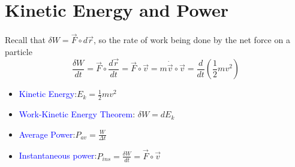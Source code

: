 \documentclass{beamer}
\begin{document}
\section{Kinetic Energy and Power}
\begin{frame}
  Recall that $\delta W = \vec{F}\circ d\vec{r}$, so the rate of work being done by the net force on a particle 
  $$
  \frac{\delta W}{dt} = \vec{F}\circ \frac{d\vec{r}}{dt}=\vec{F}\circ \vec{v} = m \dot{\vec{v}}\circ \vec{v}=\frac{d}{dt}(\frac{1}{2}mv^2) 
  $$
  \begin{itemize}
    \item \textcolor{blue}{Kinetic Energy}:$E_k=\frac{1}{2}mv^2$
    \item \textcolor{blue}{Work-Kinetic Energy Theorem}: $\delta W = dE_k$
    \item \textcolor{blue}{Average Power}:$P_{av}=\frac{W}{\Delta t}$
    \item \textcolor{blue}{Instantaneous power}:$P_{ins} = \frac{\delta W}{dt}=\vec{F}\circ \vec{v}$
  \end{itemize}
\end{frame}
\end{document}
